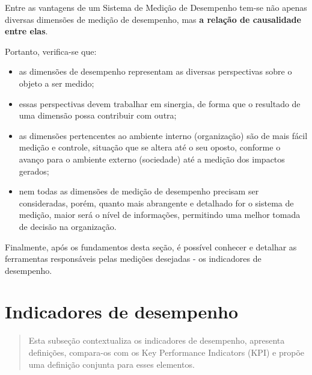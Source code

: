 \documentclass[
  letterpaper,
  DIV=11,
  numbers=noendperiod]{scrreprt}
\begin{document}
\begin{tcolorbox}[enhanced jigsaw, title=\textcolor{quarto-callout-note-color}{\faInfo}\hspace{0.5em}{Nota}, bottomrule=.15mm, arc=.35mm, bottomtitle=1mm, toprule=.15mm, coltitle=black, opacityback=0, colback=white, rightrule=.15mm, breakable, toptitle=1mm, leftrule=.75mm, titlerule=0mm, opacitybacktitle=0.6, colbacktitle=quarto-callout-note-color!10!white, left=2mm, colframe=quarto-callout-note-color-frame]

Entre as vantagens de um Sistema de Medição de Desempenho tem-se não
apenas diversas dimensões de medição de desempenho, mas \textbf{a
relação de causalidade entre elas}.

\end{tcolorbox}

Portanto, verifica-se que:

\begin{itemize}
\item
  as dimensões de desempenho representam as diversas perspectivas sobre
  o objeto a ser medido;
\item
  essas perspectivas devem trabalhar em sinergia, de forma que o
  resultado de uma dimensão possa contribuir com outra;
\item
  as dimensões pertencentes ao ambiente interno (organização) são de
  mais fácil medição e controle, situação que se altera até o seu
  oposto, conforme o avanço para o ambiente externo (sociedade) até a
  medição dos impactos gerados;
\item
  nem todas as dimensões de medição de desempenho precisam ser
  consideradas, porém, quanto mais abrangente e detalhado for o sistema
  de medição, maior será o nível de informações, permitindo uma melhor
  tomada de decisão na organização.
\end{itemize}

Finalmente, após os fundamentos desta seção, é possível conhecer e
detalhar as ferramentas responsáveis pelas medições desejadas - os
indicadores de desempenho.

\hypertarget{indicadores-de-desempenho}{%
\chapter{Indicadores de desempenho}\label{indicadores-de-desempenho}}

\begin{quote}
Esta subseção contextualiza os indicadores de desempenho, apresenta
definições, compara-os com os Key Performance Indicators (KPI) e propõe
uma definição conjunta para esses elementos.
\end{quote}
\end{document}
